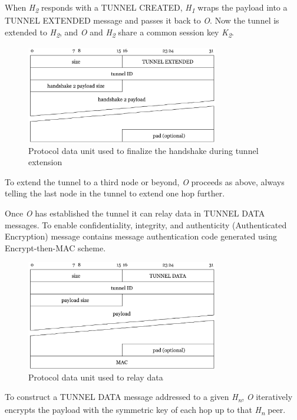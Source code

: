 \documentclass{article}
\begin{document}
When \textit{H\textsubscript{2}} responds with a TUNNEL CREATED, \textit{H\textsubscript{1}} wraps the payload into a TUNNEL EXTENDED message and passes it back to \textit{O}. Now the tunnel is extended to \textit{H\textsubscript{2}}, and \textit{O} and \textit{H\textsubscript{2}} share a common session key \textit{K\textsubscript{2}}.
\begin{figure}[H]
\centering
     \includegraphics[width=0.75\textwidth]{msg_tunnel_extended.pdf}
      \caption{Protocol data unit used to finalize the handshake during tunnel extension}
\end{figure}

To extend the tunnel to a third node or beyond, \textit{O} proceeds as above, always telling the last node in the tunnel to extend one hop further.

Once \textit{O} has established the tunnel it can relay data in TUNNEL DATA messages. To enable confidentiality, integrity, and authenticity (Authenticated Encryption) message contains message authentication code generated using Encrypt-then-MAC scheme.

\begin{figure}[H]
\centering
     \includegraphics[width=0.75\textwidth]{msg_tunnel_data.pdf}
      \caption{Protocol data unit used to relay data}
\end{figure}

To construct a TUNNEL DATA message addressed to a given \textit{H\textsubscript{n}}, \textit{O} iteratively encrypts the payload with the symmetric key of each hop up to that \textit{H\textsubscript{n}} peer.
\end{document}
